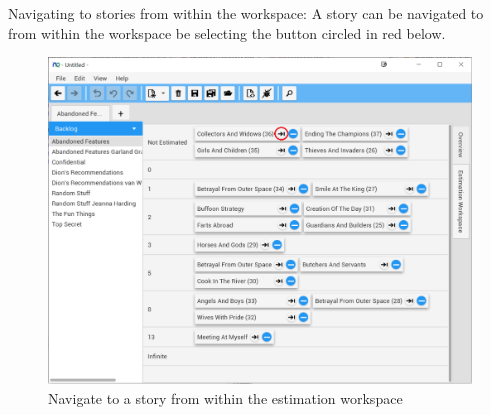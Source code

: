 \pagebreak
Navigating to stories from within the workspace:\newline
A story can be navigated to from within the workspace be selecting the button circled in red below.

\begin{figure}[H]
\centering
\includegraphics[width=\textwidth]{images/screenshots/estimationWorkspace4.PNG}
\caption{Navigate to a story from within the estimation workspace}
\label{fig:new_project}
\end{figure}






